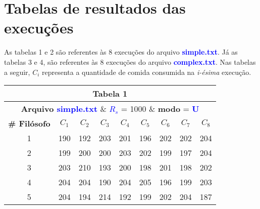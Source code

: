 \documentclass[11pt]{article}
\begin{document}
\section{Tabelas de resultados das execuções}

As tabelas 1 e 2 são referentes às 8 execuções do arquivo \textbf{\textcolor{blue}{simple.txt}}. Já as tabelas 3 e 4, são referentes às 8 execuções do arquivo \textbf{\textcolor{blue}{complex.txt}}. Nas tabelas a seguir, \textbf{$C_i$} representa a quantidade de comida consumida na \textit{i-ésima} execução.

\begin{table}[!h]
	\begin{center}
		\begin{tabular}{| c | c | c | c | c | c | c | c | c |}
		\hline
		\multicolumn{9}{|c|}{\textbf{Tabela 1}} \\ \hline
		\multicolumn{9}{|c|}{\textbf{Arquivo \textcolor{blue}{simple.txt}} \& \textbf{\textcolor{blue}{$R_s$}} = 1000 \& \textbf{modo} = \textbf{\textcolor{blue}{U}}} \\
		\hline
			\textbf{\# Filósofo} & \textbf{$C_1$} & \textbf{$C_2$} & \textbf{$C_3$} & \textbf{$C_4$} & \textbf{$C_5$} & \textbf{$C_6$} & \textbf{$C_7$} & \textbf{$C_8$} \\ \hline
			1 & 190 & 192 & 203 & 201 & 196 & 202 & 202 & 204 \\ \hline
			2 & 199 & 200 & 200 & 203 & 202 & 199 & 197 & 204 \\ \hline
			3 & 203 & 210 & 193 & 200 & 198 & 201 & 198 & 202 \\ \hline
			4 & 204 & 204 & 190 & 204 & 205 & 196 & 199 & 203 \\ \hline
			5 & 204 & 194 & 214 & 192 & 199 & 202 & 204 & 187 \\ \hline
		\end{tabular}
	\end{center}
\end{table}

\pagebreak
\end{document}
